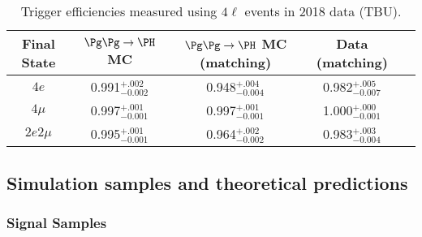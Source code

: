 \begin{table}[h]
	\centering
	\begin{tabular}{|c|c|c|c|c|} 
		\hline %
		Final State  & $\ggH$ MC & $\ggH$ MC (matching)  & Data (matching)   \\
		\hline %
		$4e$  & 0.991$^{+.002}_{-0.002}$ & 0.948$^{+.004}_{-0.004}$ & 0.982$^{+.005}_{-0.007}$ \\
		$4\mu$  & 0.997$^{+.001}_{-0.001}$ & 0.997$^{+.001}_{-0.001}$ & 1.000$^{+.000}_{-0.001}$ \\
		$2e2\mu$  & 0.995$^{+.001}_{-0.001}$ & 0.964$^{+.002}_{-0.002}$ & 0.983$^{+.003}_{-0.004}$ \\
		\hline %
	\end{tabular}
	\caption{
		Trigger efficiencies measured using $4\ell$ events in 2018 data (TBU).}
	\label{tab:TrigEffC}
\end{table}

\subsection{Simulation samples and theoretical predictions}

\subsubsection{Signal Samples}

